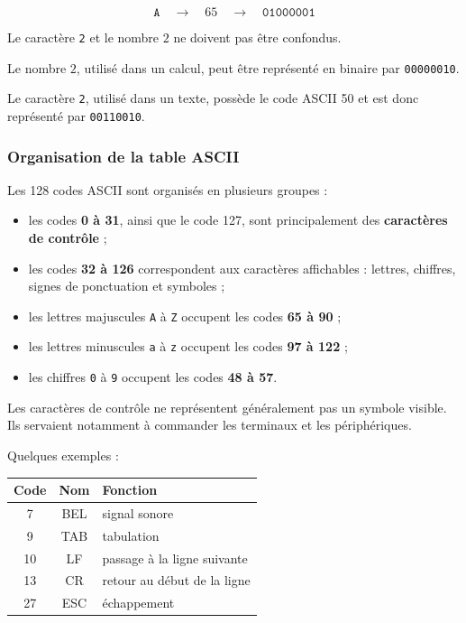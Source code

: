 \documentclass[11pt, a4paper]{book}
\begin{document}
\[
\texttt{A}
\quad\longrightarrow\quad
65
\quad\longrightarrow\quad
\texttt{01000001}
\]

\begin{aretenir}
Le caractère \texttt{2} et le nombre $2$ ne doivent pas être confondus.

Le nombre $2$, utilisé dans un calcul, peut être représenté en binaire par
\texttt{00000010}.

Le caractère \texttt{2}, utilisé dans un texte, possède le code ASCII 50 et est
donc représenté par \texttt{00110010}.
\end{aretenir}

\subsubsection{Organisation de la table ASCII}

Les 128 codes ASCII sont organisés en plusieurs groupes :

\begin{itemize}
    \item les codes \textbf{0 à 31}, ainsi que le code 127, sont principalement
    des \textbf{caractères de contrôle} ;

    \item les codes \textbf{32 à 126} correspondent aux caractères affichables :
    lettres, chiffres, signes de ponctuation et symboles ;

    \item les lettres majuscules \texttt{A} à \texttt{Z} occupent les codes
    \textbf{65 à 90} ;

    \item les lettres minuscules \texttt{a} à \texttt{z} occupent les codes
    \textbf{97 à 122} ;

    \item les chiffres \texttt{0} à \texttt{9} occupent les codes
    \textbf{48 à 57}.
\end{itemize}

Les caractères de contrôle ne représentent généralement pas un symbole visible.
Ils servaient notamment à commander les terminaux et les périphériques.

Quelques exemples :

\begin{center}
\renewcommand{\arraystretch}{1.2}
\begin{tabular}{ccl}
\toprule
\textbf{Code} & \textbf{Nom} & \textbf{Fonction} \\
\midrule
7  & BEL & signal sonore \\
9  & TAB & tabulation \\
10 & LF  & passage à la ligne suivante \\
13 & CR  & retour au début de la ligne \\
27 & ESC & échappement \\
\bottomrule
\end{tabular}
\end{center}
\end{document}
